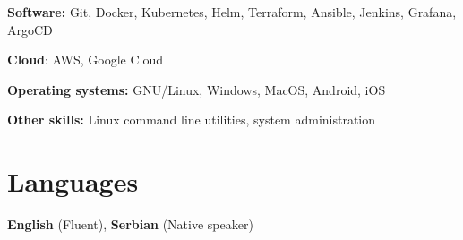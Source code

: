\documentclass[11pt,a4paper,roman]{moderncv}        %
\begin{document}
\textbf{Software:} Git, Docker, Kubernetes, Helm, Terraform, Ansible, Jenkins, Grafana, ArgoCD

\textbf{Cloud}: AWS, Google Cloud

\textbf{Operating systems:} GNU/Linux, Windows, MacOS, Android, iOS

\textbf{Other skills:} Linux command line utilities, system administration

\section{Languages}
	\textbf{English} (Fluent), \textbf{Serbian} (Native speaker)
\end{document}
